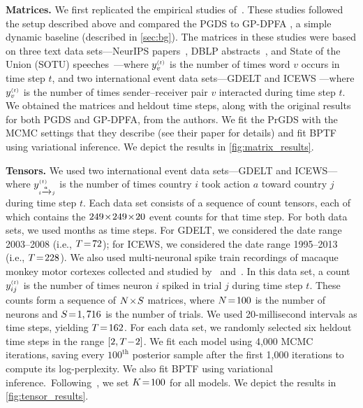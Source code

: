 \documentclass{article}
\begin{document}
\textbf{Matrices.} We first replicated the empirical studies of~\citet{schein2016poisson}. These studies followed the setup described above and compared the PGDS to GP-DPFA \cite{acharya2015nonparametric}, a simple dynamic baseline (described in \cref{sec:bg}). The matrices in these studies were based on three text data sets---NeurIPS papers~\cite{neuripscorpus}, DBLP abstracts~\cite{dblp}, and State of the Union (SOTU) speeches~\cite{sotu}---where $\yvt$ is the number of times word $v$ occurs in time step $t$, and two international event data sets---GDELT \cite{leetaru2013gdelt} and ICEWS \cite{boscheeicews}---where $\yvt$ is the number of times sender--receiver pair $v$ interacted during time step $t$. We obtained the matrices and heldout time steps, along with the original results for both PGDS and GP-DPFA, from the authors. We fit the PrGDS with the MCMC settings that they describe (see their paper  \cite{schein2016poisson} for details) and fit BPTF using variational inference. We depict the results in \cref{fig:matrix_results}.~

\textbf{Tensors.} We used two international event data sets---GDELT and ICEWS---where $y_{\mathsmaller{i \xrightarrow{a}j}}^{\mathsmaller{(t)}}$ is the number of times country $i$ took action $a$ toward country $j$ during time step $t$.
Each data set consists of a sequence of count tensors, each of which contains the $249 \!\times\! 249 \!\times\! 20$ event counts for that time step. For both data sets, we used months as time steps. For GDELT, we considered the date range 2003--2008 (i.e., $T \!=\! 72$); for ICEWS, we considered the date range 1995--2013 (i.e., $T \!=\! 228$). We also used multi-neuronal spike train recordings of macaque monkey motor cortexes collected and studied by~\citet{vyas2018neural} and~\citet{williams2018unsupervised}.  In this data set, a count $y^{\mathsmaller{(t)}}_{ij}$ is the number of times neuron $i$ spiked in trial $j$ during time step $t$. These counts form a sequence of $N \!\times\! S$ matrices, where $N \!=\! 100$ is the number of neurons and $S \!=\! 1,716$ is the number of trials. We used 20-millisecond intervals as time steps, yielding $T \!=\! 162$. For each data set, we randomly selected six heldout time steps in the range $[2, T\!-\! 2]$. We fit each model using 4,000 MCMC iterations, saving every $100^{\textrm{th}}$ posterior sample after the first 1,000 iterations to compute its log-perplexity. We also fit BPTF using variational inference.~Following~\citet{schein2016poisson}, we set $K \!=\! 100$ for all models. We depict the results in \cref{fig:tensor_results}.
\end{document}
